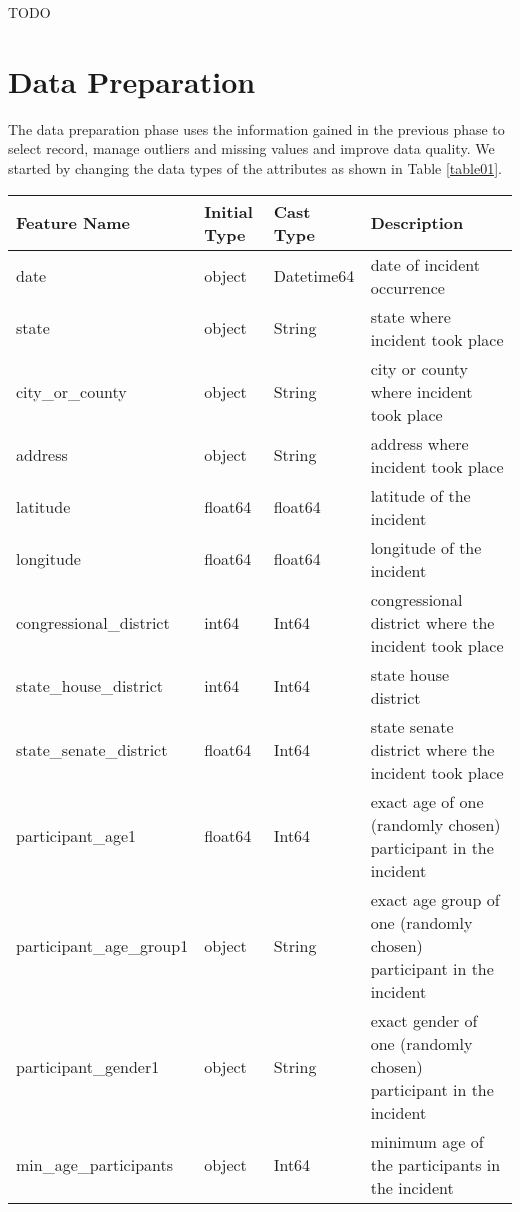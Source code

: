 \documentclass[10pt,a4paper]{report}
\begin{document}
TODO

\chapter{Data Preparation}

The data preparation phase uses the information gained in the previous phase to select record, manage outliers and missing values and improve data quality.
We started by changing the data types of the attributes as shown in Table \ref{table01}.

\begin{table}
	\centering
	\begin{small}
	\begin{tabular}{|l|l|l|p{7cm}|}
		\hline
		\textbf{Feature Name} & \textbf{Initial Type} & \textbf{Cast Type} & \textbf{Description}\\
		\hline
		date & object & Datetime64 & date of incident occurrence\\
		\hline
		state & object & String & state where incident took place\\
		\hline
		city\_or\_county & object & String & city or county where incident took place\\
		\hline
		address & object & String & address where incident took place\\
		\hline
		latitude & float64 & float64 & latitude of the incident\\
		\hline
		longitude & float64 & float64 & longitude of the incident\\
		\hline
		congressional\_district & int64 & Int64 & congressional district where the incident took place\\
		\hline
		state\_house\_district & int64 & Int64 & state house district\\
		\hline
		state\_senate\_district & float64 & Int64 & state senate district where the incident took place\\
		\hline
		participant\_age1 & float64 & Int64 & exact age of one (randomly chosen) participant in the incident\\
		\hline
		participant\_age\_group1 & object & String & exact age group of one (randomly chosen) participant in the incident\\
		\hline
		participant\_gender1 & object & String & exact gender of one (randomly chosen) participant in the incident\\
		\hline
		min\_age\_participants & object & Int64 & minimum age of the participants in the incident\\

\end{tabular}
\end{small}
\end{table}
\end{document}
